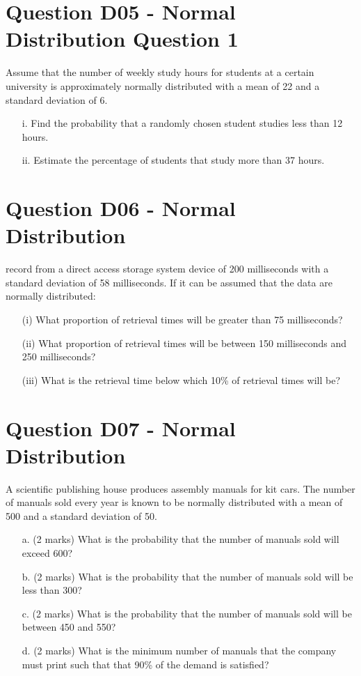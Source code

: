 \documentclass[]{report}
\begin{document}
\section{Question D05 - Normal Distribution Question 1}
Assume that the number of weekly study hours for students at a certain university is approximately normally distributed with a mean of 22 and a standard deviation of 6.

\begin{itemize}
	\item[i.] Find the probability that a randomly chosen student studies less than 12 hours.
	\item[ii.] Estimate the percentage of students that study more than 37 hours.
\end{itemize}

\section{Question D06 - Normal Distribution } %
record from a direct access storage system device of 200 milliseconds
with a standard deviation of 58 milliseconds. If it can be assumed that
the data are normally distributed:

\begin{itemize}
	\item[(i)] What proportion of retrieval times will be greater than 75
	milliseconds?
	\item[(ii)] What proportion of retrieval times will be between 150
	milliseconds and 250 milliseconds?
	\item[(iii)] What is the retrieval time below which 10\% of retrieval times
	will be?
\end{itemize}

\section{Question D07 - Normal Distribution } %

A scientific publishing house produces assembly manuals for kit cars. The number
of manuals sold every year is known to be normally distributed with a mean of 500 and a
standard deviation of 50.

\begin{itemize}
	\item[a.](2 marks) What is the probability that the number of manuals sold will exceed 600?
	\item[b.](2 marks) What is the probability that the number of manuals sold will be less than 300?
	\item[c.](2 marks)  What is the probability that the number of manuals sold will be between 450 and 550?
	\item[d.](2 marks)  What is the minimum number of manuals that the company must print such
	that that 90\% of the demand is satisfied?
\end{itemize}
\end{document}
